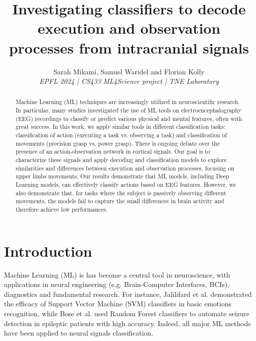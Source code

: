 \documentclass[10pt,conference,compsocconf]{IEEEtran}
\begin{document}
\title{Investigating classifiers to decode execution and observation processes from intracranial signals}

\author{
  Sarah Mikami, Samuel Waridel and Florian Kolly \\
  \textit{EPFL 2024 | CS433}
  \textit{ML4Science project | TNE Laboratory}
}

\maketitle

\begin{abstract}
    Machine Learning (ML) techniques are increasingly utilized in neuroscientific research. In particular, many studies investigated the use of ML tools on electroencephalography (EEG) recordings to classify or predict various physical and mental features, often with great success. In this work, we apply similar tools in different classification tasks: classification of action (executing a task vs. observing a task) and classification of movements (precision grasp vs. power grasp). There is ongoing debate over the presence of an action-observation network in cortical signals. Our goal is to characterize these signals and apply decoding and classification models to explore similarities and differences between execution and observation processes, focusing on upper limbs movements. Our results demonstrate that ML models, including Deep Learning models, can effectively classify actions based on EEG features. However, we also demonstrate that, for tasks where the subject is passively observing different movements, the models fail to capture the small differences in brain activity and therefore achieve low performances.
\end{abstract}

\section{Introduction}
Machine Learning (ML) is has become a central tool in neuroscience, with applications in neural engineering (e.g. Brain-Computer Interfaces, BCIs), diagnostics and fundamental research. For instance, Jalilifard et al. \cite{EmotionClassificationSVM} demonstrated the efficacy of Support Vector Machine (SVM) classifiers in basic emotions recognition, while Bose et al. \cite{EEGRandomForset} used Random Forest classifiers to automate seizure detection in epileptic patients with high accuracy. Indeed, all major ML methods have been applied to neural signals classification\cite{EEGMLReview}.
\end{document}
